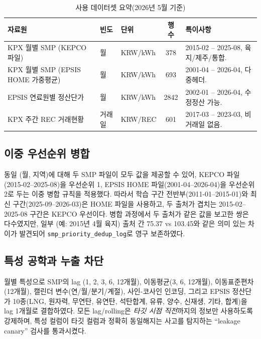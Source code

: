 \documentclass[11pt,a4paper]{article}
\begin{document}
\begin{table}[h]
\centering
\caption{사용 데이터셋 요약(2026년 5월 기준)}
\label{tab:sources}
\small
\begin{tabularx}{\linewidth}{l l l c X}
\toprule
\textbf{자료원} & \textbf{빈도} & \textbf{단위} & \textbf{행 수} & \textbf{특이사항} \\
\midrule
KPX 월별 SMP (KEPCO 파일)            & 월   & KRW/kWh   & 378  & 2015-02 -- 2025-08, 육지/제주/통합. \\
KPX 월별 SMP (EPSIS HOME 가중평균)   & 월   & KRW/kWh   & 693  & 2001-04 -- 2026-04, 다중헤더. \\
EPSIS 연료원별 정산단가               & 월   & KRW/kWh   & 2842 & 2002-01 -- 2026-04, 수정정산 가능. \\
KPX 주간 REC 거래현황                 & 거래일 & KRW/REC   & 601  & 2017-03 -- 2023-03, 비거래일 없음. \\
\bottomrule
\end{tabularx}
\end{table}

\subsection{이중 우선순위 병합}

동일 (월, 지역)에 대해 두 SMP 파일이 모두 값을 제공할 수 있어,
KEPCO 파일(2015-02--2025-08)을 우선순위 1, EPSIS HOME
파일(2001-04--2026-04)을 우선순위 2로 두는 이중 병합 규칙을
적용했다. 따라서 학습 구간 전반부(2011-01--2015-01)와
최신 구간(2025-09--2026-03)은 HOME 파일을 사용하고, 두 출처가
겹치는 2015-02--2025-08 구간은 KEPCO 우선이다. 병합 과정에서
두 출처가 같은 값을 보고한 쌍은 다수였지만, 일부 (예: 2015년 4월
육지) 출처 간 \SI{75.37}{} vs \SI{103.45}{}와 같은 의미 있는 차이가
발견되어 \texttt{smp\_priority\_dedup\_log}로 영구 보존하였다.

\subsection{특성 공학과 누출 차단}

월별 특성으로 SMP의 lag (1, 2, 3, 6, 12개월), 이동평균(3, 6, 12개월),
이동표준편차(12개월), 캘린더 변수(연/월/분기/계절), 사인-코사인
인코딩, 그리고 EPSIS 정산단가 10종(LNG, 원자력, 무연탄,
유연탄, 석탄합계, 유류, 양수, 신재생, 기타, 합계)을 lag 1개월로
결합하였다.
모든 lag/rolling은 \emph{타깃 시점 직전}까지의 정보만 사용하도록
강제하며, 특성 컬럼이 타깃 컬럼과 정확히 동일해지는 사고를
탐지하는 ``leakage canary'' 검사를 통과시켰다.
\end{document}
